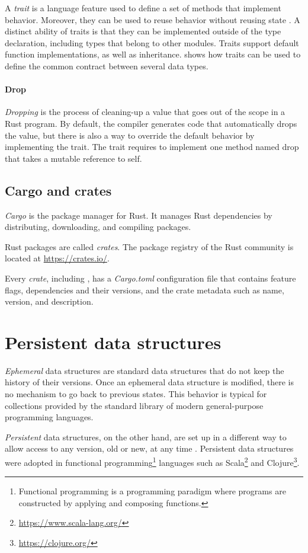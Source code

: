 A \emph{trait} is a language feature used to define a set of methods that implement behavior. Moreover, they can be used to reuse behavior without reusing state \cite{schaerli-ducasse-nierstrasz-traits}. A distinct ability of traits is that they can be implemented outside of the type declaration, including types that belong to other modules. Traits support default function implementations, as well as inheritance.  shows how traits can be used to define the common contract between several data types.

\paragraph{Drop}
\emph{Dropping} is the process of cleaning-up a value that goes out of the scope in a Rust program. By default, the compiler generates code that automatically drops the value, but there is also a way to override the default behavior by implementing the  trait. The  trait requires to implement one method named drop that takes a mutable reference to self.

\subsection{Cargo and crates}
\emph{Cargo} is the package manager for Rust. It manages Rust dependencies by distributing, downloading, and compiling packages.

Rust packages are called \emph{crates}. The package registry of the Rust community is located at \url{https://crates.io/}.

Every \emph{crate}, including \pvecrs{}, has a \emph{Cargo.toml} configuration file that contains feature flags, dependencies and their versions, and the crate metadata such as name, version, and description.

\section{Persistent data structures}
\label{sec:psds}

\emph{Ephemeral} data structures are standard data structures that do not keep the history of their versions. Once an ephemeral data structure is modified, there is no mechanism to go back to previous states. This behavior is typical for collections provided by the standard library of modern general-purpose programming languages.

\emph{Persistent} data structures, on the other hand, are set up in a different way to allow access to any version, old or new, at any time \cite{making-data-structures-persistent}. Persistent data structures were adopted in functional programming\footnote{Functional programming is a programming paradigm where programs are constructed by applying and composing functions.} languages such as Scala\footnote{\url{https://www.scala-lang.org/}} and Clojure\footnote{\url{https://clojure.org/}}.

